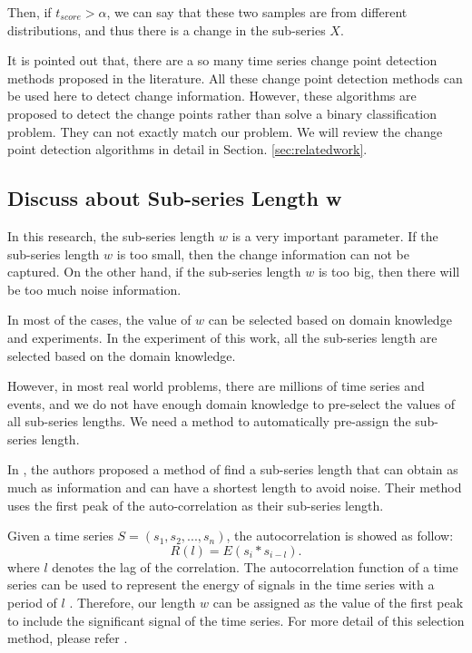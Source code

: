 Then, if $t_{score} > \alpha$, we can say that these two samples are from different distributions, and thus there is a change in the sub-series $X$.

It is pointed out that, there are a so many time series change point detection methods \cite{liu2013change,chen2013contextual} proposed in the literature. 
All these change point detection methods can be used here to detect change information.
However, these algorithms are proposed to detect the change points rather than solve a binary classification problem. They can not exactly match our problem. We will review the change point detection algorithms in detail in Section. \ref{sec:relatedwork}.

\subsection{Discuss about Sub-series Length w}

In this research, the sub-series length $w$ is a very important parameter.
If the sub-series length $w$ is too small, then the change information can not be captured. 
On the other hand, if the sub-series length $w$ is too big, then there will be too much noise information.

In most of the cases, the value of $w$ can be selected based on domain knowledge and experiments. In the experiment of this work, all the sub-series length are selected based on the domain knowledge. 

However, in most real world problems, there are millions of time series and events, and we do not have enough domain knowledge to pre-select the values of all sub-series lengths. We need a method to automatically pre-assign the sub-series length.

In \cite{ding2015yading,luo2014correlating}, the authors proposed a method of find a sub-series length that can obtain as much as information and can have a shortest length to avoid noise.
Their method uses the first peak of the auto-correlation as their sub-series length.

Given a time series $S=(s_1,s_2,...,s_n)$, the autocorrelation is showed as follow:
\begin{equation}
R(l) = E(s_i*s_{i-l}).
\end{equation}
where $l$ denotes the lag of the correlation. The autocorrelation function of a time series can be used to represent the energy of signals in the time series with a period of $l$ \cite{hamilton1994time}. Therefore, our length $w$ can be assigned as the value of the first peak to include the significant signal of the time series. For more detail of this selection method, please refer \cite{luo2014correlating,ding2015yading}.


